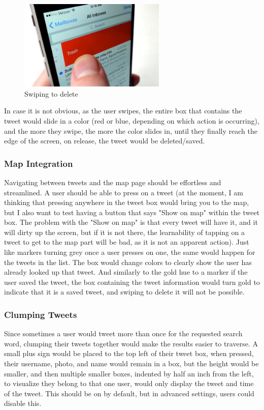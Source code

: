 \documentclass[11pt]{article}
\begin{document}
\begin{figure}[H]
    \centering
    \includegraphics[width=7cm]{swipeDelete}
    \caption{Swiping to delete}
    \label{fig:swipeDelete}
\end{figure}

In case it is not obvious, as the user swipes, the entire box that contains the tweet would slide in a color (red or blue, depending on which action is occurring), and the more they swipe, the more the color slides in, until they finally reach the edge of the screen, on release, the tweet would be deleted/saved.

\subsubsection{Map Integration}
Navigating between tweets and the map page should be effortless and streamlined. A user should be able to press on a tweet (at the moment, I am thinking that pressing anywhere in the tweet box would bring you to the map, but I also want to test having a button that says "Show on map" within the tweet box. The problem with the "Show on map" is that every tweet will have it, and it will dirty up the screen, but if it is not there, the learnability of tapping on a tweet to get to the map part will be bad, as it is not an apparent action). Just like markers turning grey once a user presses on one, the same would happen for the tweets in the list. The box would change colors to clearly show the user has already looked up that tweet. And similarly to the gold hue to a marker if the user saved the tweet, the box containing the tweet information would turn gold to indicate that it is a saved tweet, and swiping to delete it will not be possible.

\subsubsection{Clumping Tweets}
Since sometimes a user would tweet more than once for the requested search word, clumping their tweets together would make the results easier to traverse. A small plus sign would be placed to the top left of their tweet box, when pressed, their username, photo, and name would remain in a box, but the height would be smaller, and then multiple smaller boxes, indented by half an inch from the left, to visualize they belong to that one user, would only display the tweet and time of the tweet. This should be on by default, but in advanced settings, users could disable this.
\end{document}
